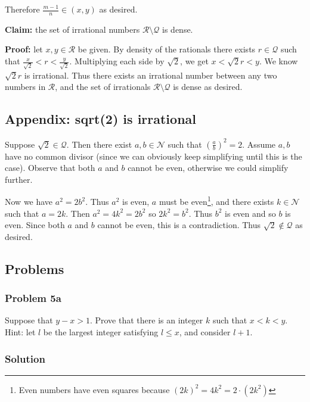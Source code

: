 \vs

Therefore $\frac{m-1}{n}\in(x,y)$ as desired.

\vs

\textbf{Claim:} the set of irrational numbers $\mathcal{R}\setminus\mathcal{Q}$ is dense.

\textbf{Proof:} let $x,y\in\mathcal{R}$ be given. By density of the rationals
there exists $r\in\mathcal{Q}$ such that
$\frac{x}{\sqrt{2}}<r<\frac{y}{\sqrt{2}}$. Multiplying each side by
$\sqrt{2}$, we get $x<\sqrt{2}r<y$. We know $\sqrt{2}r$ is irrational.
Thus there exists an irrational number between any two numbers in
$\mathcal{R}$, and the set of irrationals $\mathcal{R}\setminus\mathcal{Q}$ is dense as desired.

\subsection{Appendix: sqrt(2) is irrational}\label{sqrt2proof}
Suppose $\sqrt{2}\in\mathcal{Q}$. Then there exist $a,b\in\mathcal{N}$ such that
$\left(\frac{a}{b}\right)^{2}=2$. Assume $a, b$ have no common divisor
(since we can obviously keep simplifying until this is the case).
Observe that both $a$ and $b$ cannot be even, otherwise we could
simplify further.

\vs

Now we have $a^{2}=2b^{2}$. Thus $a^{2}$ is even, $a$ must be
even\footnote{Even numbers have even squares because
  ${(2k)}^{2}=4k^{2}=2\cdot(2k^{2})$}, and there exists
$k\in\mathcal{N}$ such that $a=2k$. Then $a^{2}=4k^{2}=2b^{2}$ so
$2k^{2}=b^{2}$. Thus $b^{2}$ is even and so $b$ is even. Since both
$a$ and $b$ cannot be even, this is a contradiction. Thus
$\sqrt{2}\notin\mathcal{Q}$ as desired.

\subsection{Problems}
\subsubsection*{Problem 5a}
Suppose that $y-x>1$. Prove that there is an integer $k$ such that
$x<k<y$. Hint: let $l$ be the largest integer satisfying $l\leq x$, and
consider $l+1$.

\subsubsection*{Solution}


